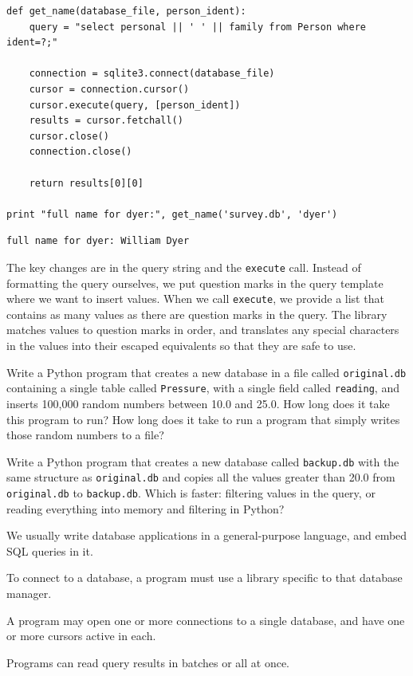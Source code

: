 \documentclass{book}
\begin{document}
\begin{verbatim}
def get_name(database_file, person_ident):
    query = "select personal || ' ' || family from Person where ident=?;"

    connection = sqlite3.connect(database_file)
    cursor = connection.cursor()
    cursor.execute(query, [person_ident])
    results = cursor.fetchall()
    cursor.close()
    connection.close()

    return results[0][0]

print "full name for dyer:", get_name('survey.db', 'dyer')
\end{verbatim}

\begin{verbatim}
full name for dyer: William Dyer
\end{verbatim}

The key changes are in the query string and the \texttt{execute} call.
Instead of formatting the query ourselves, we put question marks in the
query template where we want to insert values. When we call
\texttt{execute}, we provide a list that contains as many values as
there are question marks in the query. The library matches values to
question marks in order, and translates any special characters in the
values into their escaped equivalents so that they are safe to use.

\begin{challenge}
  Write a Python program that creates a new database in a file called
  \texttt{original.db} containing a single table called
  \texttt{Pressure}, with a single field called \texttt{reading}, and
  inserts 100,000 random numbers between 10.0 and 25.0. How long does it
  take this program to run? How long does it take to run a program that
  simply writes those random numbers to a file?
\end{challenge}

\begin{challenge}
  Write a Python program that creates a new database called
  \texttt{backup.db} with the same structure as \texttt{original.db} and
  copies all the values greater than 20.0 from \texttt{original.db} to
  \texttt{backup.db}. Which is faster: filtering values in the query, or
  reading everything into memory and filtering in Python?
\end{challenge}

\begin{keypoints}
\begin{swcitemize}
\item
  We usually write database applications in a general-purpose language,
  and embed SQL queries in it.
\item
  To connect to a database, a program must use a library specific to
  that database manager.
\item
  A program may open one or more connections to a single database, and
  have one or more cursors active in each.
\item
  Programs can read query results in batches or all at once.
\end{swcitemize}
\end{keypoints}
\end{document}
